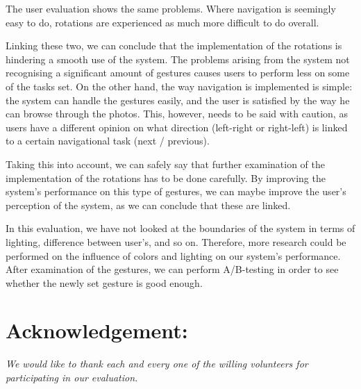 \documentclass[11pt,a4paper]{article}
\begin{document}
The user evaluation shows the same problems. Where navigation is seemingly easy to do, rotations are experienced as much more difficult to do overall. 

Linking these two, we can conclude that the implementation of the rotations is hindering a smooth use of the system. The problems arising from the system not recognising a significant amount of gestures causes users to perform less on some of the tasks set. On the other hand, the way navigation is implemented is simple: the system can handle the gestures easily, and the user is satisfied by the way he can browse through the photos. This, however, needs to be said with caution, as users have a different opinion on what direction (left-right or right-left) is linked to a certain navigational task (next / previous).

Taking this into account, we can safely say that further examination of the implementation of the rotations has to be done carefully. By improving the system's performance on this type of gestures, we can maybe improve the user's perception of the system, as we can conclude that these are linked. 

In this evaluation, we have not looked at the boundaries of the system in terms of lighting, difference between user's, and so on. Therefore, more research could be performed on the influence of colors and lighting on our system's performance.
After examination of the gestures, we can perform A/B-testing in order to see whether the newly set gesture is good enough. 

{}



\section*{Acknowledgement:}
\textit{We would like to thank each and every one of the willing volunteers for participating in our evaluation.} 
\end{document}
